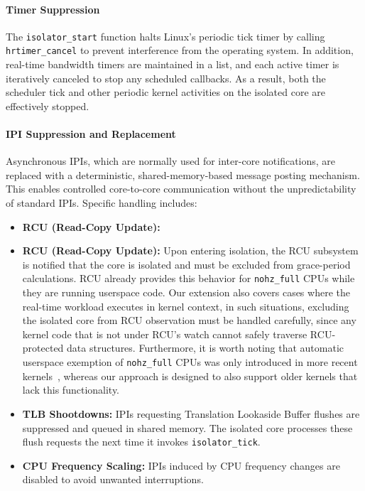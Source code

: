 \documentclass[letterpaper]{article}
\begin{document}
\paragraph{Timer Suppression}  
The \texttt{isolator\_start} function halts Linux’s periodic tick timer by calling \texttt{hrtimer\_cancel} to
prevent interference from the operating system. In addition, real-time bandwidth timers are maintained in a list,
and each active timer is iteratively canceled to stop any scheduled callbacks. As a result, both the scheduler tick
and other periodic kernel activities on the isolated core are effectively stopped.

\paragraph{IPI Suppression and Replacement}  
Asynchronous IPIs, which are normally used for inter-core notifications, are replaced with a deterministic,
shared-memory-based message posting mechanism. This enables controlled core-to-core communication without
the unpredictability of standard IPIs. Specific handling includes:
\begin{itemize}
    \item \textbf{RCU (Read-Copy Update):} \item \textbf{RCU (Read-Copy Update):} Upon entering isolation, the RCU subsystem is notified that the core is isolated and must be excluded from grace-period calculations. RCU already provides this behavior for \texttt{nohz\_full} CPUs while they are running userspace code. Our extension also covers cases where the real-time workload executes in kernel context, in such situations, excluding the isolated core from RCU observation must be handled carefully, since any kernel code that is not under RCU's watch cannot safely traverse RCU-protected data structures. Furthermore, it is worth noting that automatic userspace exemption of \texttt{nohz\_full} CPUs was only introduced in more recent kernels~\cite{rcu-lpc2024}, whereas our approach is designed to also support older kernels that lack this functionality.

    \item \textbf{TLB Shootdowns:} IPIs requesting Translation Lookaside Buffer flushes are suppressed and queued in shared memory.
      The isolated core processes these flush requests the next time it invokes \texttt{isolator\_tick}.
    \item \textbf{CPU Frequency Scaling:} IPIs induced by CPU frequency changes are disabled to avoid unwanted interruptions.
\end{itemize}
\end{document}
